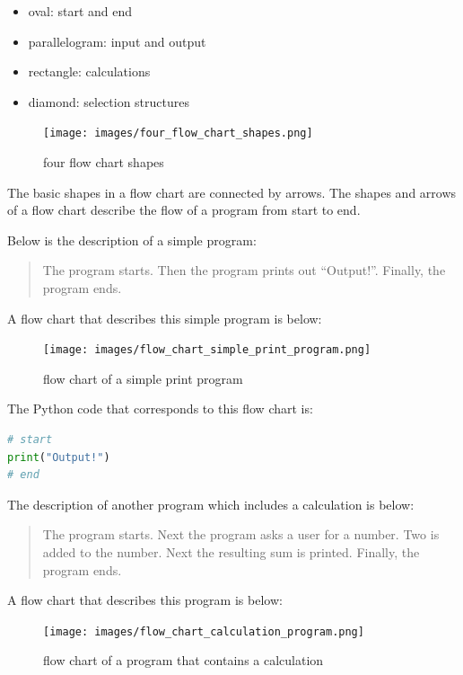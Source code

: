 \documentclass{book}
\providecommand{\tightlist}{%
      \setlength{\itemsep}{0pt}\setlength{\parskip}{0pt}}
\begin{document}
\begin{itemize}
\tightlist
\item
  oval: start and end
\item
  parallelogram: input and output
\item
  rectangle: calculations
\item
  diamond: selection structures
\end{itemize}

\begin{figure}
\centering
\texttt{[image: images/four\_flow\_chart\_shapes.png]}
\caption{four flow chart shapes}
\end{figure}

The basic shapes in a flow chart are connected by arrows. The shapes and
arrows of a flow chart describe the flow of a program from start to end.
    




    
        Below is the description of a simple program:

\begin{quote}
The program starts. Then the program prints out ``Output!''. Finally,
the program ends.
\end{quote}

A flow chart that describes this simple program is below:

\begin{figure}
\centering
\texttt{[image: images/flow\_chart\_simple\_print\_program.png]}
\caption{flow chart of a simple print program}
\end{figure}

The Python code that corresponds to this flow chart is:

\begin{lstlisting}[language=Python]
# start
print("Output!")
# end
\end{lstlisting}
    




    
        The description of another program which includes a calculation is
below:

\begin{quote}
The program starts. Next the program asks a user for a number. Two is
added to the number. Next the resulting sum is printed. Finally, the
program ends.
\end{quote}

A flow chart that describes this program is below:

\begin{figure}
\centering
\texttt{[image: images/flow\_chart\_calculation\_program.png]}
\caption{flow chart of a program that contains a calculation}
\end{figure}
\end{document}

